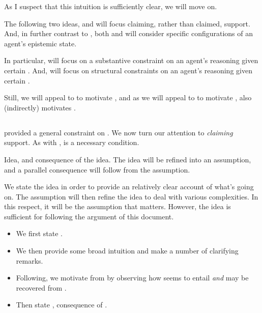 \begin{note}
  As I suspect that this intuition is sufficiently clear, we will move on.

  The following two ideas, \ideaCSB{} and \ideaCSC{} will focus claiming, rather than claimed, support.
  And, in further contrast to \ideaCSA{}, both \ideaCSB{} and \ideaCSC{} will consider specific configurations of an agent's epistemic state.

  In particular, \ideaCSB{} will focus on a substantive constraint on an agent's reasoning given certain \epVAd{} .
  And, \ideaCSC{} will focus on structural constraints on an agent's reasoning given certain \epVAd{} .

  Still, we will appeal to \ideaCSA{} to motivate \ideaCSB{}, and as we will appeal to \ideaCSB{} to motivate \ideaCSC{}, \ideaCSA{} also (indirectly) motivates \ideaCSC{}.
\end{note}

\subsection{}
\label{sec:ideaCSB}


\subsubsection{}
\label{sec:ideaCSB}

\begin{note}
  \ideaCSA{} provided a general constraint on \support{}.
  We now turn our attention to \emph{claiming} support.
  As with \ideaCSA{}, \ideaCSB{} is a necessary condition.

  Idea, and consequence of the idea.
  The idea will be refined into an assumption, and a parallel consequence will follow from the assumption.

  We state the idea in order to provide an relatively clear account of what's going on.
  The assumption will then refine the idea to deal with various complexities.
  In this respect, it will be the assumption that matters.
  However, the idea is sufficient for following the argument of this document.

  \begin{itemize}
  \item We first state \ideaCSB{}.
  \item We then provide some broad intuition and make a number of clarifying remarks.
  \item Following, we motivate \ideaCSB{} from \ideaCSA{} by observing how \ideaCSA{} seems to entail \ideaCSB{} \emph{and} \ideaCSA{} may be recovered from \ideaCSB{}.
  \item Then state \ideaCSC{}, consequence of \ideaCSB{}.
  \end{itemize}
\end{note}

